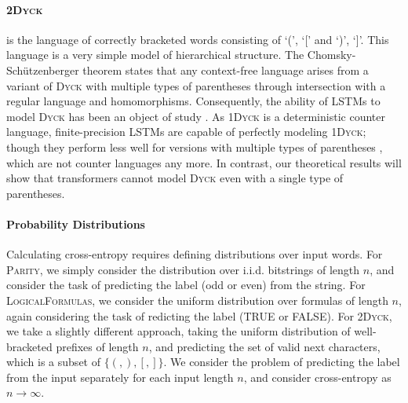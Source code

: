 \documentclass[11pt,a4paper]{article}
\newcounter{theorem}
\begin{document}
\paragraph{\textsc{2Dyck}} is the language of correctly bracketed words consisting of `(', `[' and `)', `]'.
This language is a very simple model of hierarchical structure.
The Chomsky-Sch{\"u}tzenberger theorem states that any context-free language arises from a variant of \textsc{Dyck} with multiple types of parentheses through intersection with a regular language and homomorphisms.
Consequently, the ability of LSTMs to model \textsc{Dyck} has been an object of study \cite{sennhauser2018evaluating,bernardy2018can}.
As \textsc{1Dyck} is a deterministic counter language, finite-precision LSTMs are capable of perfectly modeling \textsc{1Dyck}; though they perform less well for versions with multiple types of parentheses \cite{sennhauser2018evaluating}, which are not counter languages any more.
In contrast, our theoretical results will show that transformers cannot model \textsc{Dyck} even with a single type of parentheses.



\paragraph{Probability Distributions}
Calculating cross-entropy requires defining distributions over input words.
For \textsc{Parity}, we simply consider the distribution over i.i.d. bitstrings of length $n$, and consider the task of predicting the label (odd or even) from the string.
For \textsc{LogicalFormulas}, we consider the uniform distribution over formulas of length $n$, again considering the task of redicting the label (TRUE or FALSE).
For \textsc{2Dyck}, we take a slightly different approach, taking the uniform distribution of well-bracketed prefixes of length $n$, and predicting the set of valid next characters, which is a subset of $\{(,),[, ]\}$.
We consider the problem of predicting the label from the input separately for each input length $n$, and consider cross-entropy as $n\rightarrow \infty$.


\end{document}
